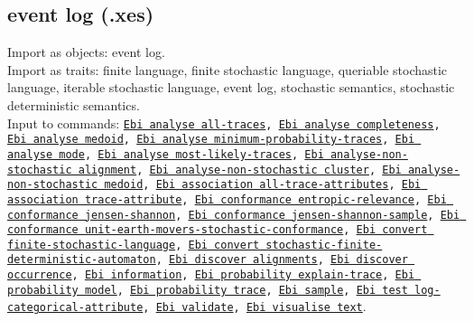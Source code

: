{\subsection{event log (.xes)}
Import as objects: event log.
\\Import as traits: finite language, finite stochastic language, queriable stochastic language, iterable stochastic language, event log, stochastic semantics, stochastic deterministic semantics.
\\Input to commands: \texttt{\hyperref[command:Ebi analyse all-traces]{Ebi analyse all-traces}, \hyperref[command:Ebi analyse completeness]{Ebi analyse completeness}, \hyperref[command:Ebi analyse medoid]{Ebi analyse medoid}, \hyperref[command:Ebi analyse minimum-probability-traces]{Ebi analyse minimum-probability-traces}, \hyperref[command:Ebi analyse mode]{Ebi analyse mode}, \hyperref[command:Ebi analyse most-likely-traces]{Ebi analyse most-likely-traces}, \hyperref[command:Ebi analyse-non-stochastic alignment]{Ebi analyse-non-stochastic alignment}, \hyperref[command:Ebi analyse-non-stochastic cluster]{Ebi analyse-non-stochastic cluster}, \hyperref[command:Ebi analyse-non-stochastic medoid]{Ebi analyse-non-stochastic medoid}, \hyperref[command:Ebi association all-trace-attributes]{Ebi association all-trace-attributes}, \hyperref[command:Ebi association trace-attribute]{Ebi association trace-attribute}, \hyperref[command:Ebi conformance entropic-relevance]{Ebi conformance entropic-relevance}, \hyperref[command:Ebi conformance jensen-shannon]{Ebi conformance jensen-shannon}, \hyperref[command:Ebi conformance jensen-shannon-sample]{Ebi conformance jensen-shannon-sample}, \hyperref[command:Ebi conformance unit-earth-movers-stochastic-conformance]{Ebi conformance unit-earth-movers-stochastic-conformance}, \hyperref[command:Ebi convert finite-stochastic-language]{Ebi convert finite-stochastic-language}, \hyperref[command:Ebi convert stochastic-finite-deterministic-automaton]{Ebi convert stochastic-finite-deterministic-automaton}, \hyperref[command:Ebi discover alignments]{Ebi discover alignments}, \hyperref[command:Ebi discover occurrence]{Ebi discover occurrence}, \hyperref[command:Ebi information]{Ebi information}, \hyperref[command:Ebi probability explain-trace]{Ebi probability explain-trace}, \hyperref[command:Ebi probability model]{Ebi probability model}, \hyperref[command:Ebi probability trace]{Ebi probability trace}, \hyperref[command:Ebi sample]{Ebi sample}, \hyperref[command:Ebi test log-categorical-attribute]{Ebi test log-categorical-attribute}, \hyperref[command:Ebi validate]{Ebi validate}, \hyperref[command:Ebi visualise text]{Ebi visualise text}}.
}
